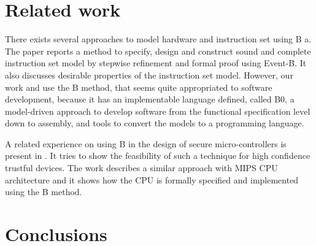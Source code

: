 \documentclass[a4paper]{llncs}
\begin{document}
\section{Related work}
\label{sec:relatedworks}

There exists several approaches to model hardware and instruction set
using B a.  The paper \cite{springerlink:Yuan2011} reports a method to
specify, design and construct sound and complete instruction set model
by stepwise refinement and formal proof using Event-B. It also
discusses desirable properties of the instruction set model. However,
our work \cite{Valerio_SBMF09} and \cite{Subotic2010} use the B
method, that seems quite appropriated to software development, because
it has an implementable language defined, called B0, a model-driven
approach \cite{Dantas_SBMF08} to develop software from the functional
specification level down to assembly, and tools to convert the models
to a programming language. 

A related experience on using B in the design of secure
micro-controllers is present in \cite{Marc20113}. It tries to show the
feasibility of such a technique for high confidence trustful
devices. The work \cite{Subotic2010} describes a similar approach with
MIPS CPU architecture and it shows how the CPU is formally specified
and implemented using the B method.

% 
%
%
%

 
\section{Conclusions}
\label{sec:conclusions} 
\end{document}
